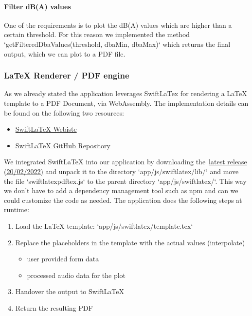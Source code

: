\paragraph{Filter dB(A) values}
One of the requirements is to plot the dB(A) values which are higher than a certain threshold.
For this reason we implemented the method `getFilteredDbaValues(threshold, dbaMin, dbaMax)` which returns the final output,
which we can plot to a PDF file.

\subsubsection{LaTeX Renderer / PDF engine}\label{subsubsec:latex-renderer-pdf-engine}
As we already stated the application leverages SwiftLaTex for rendering a LaTeX template to a PDF Document, via WebAssembly.
The implementation details can be found on the following two resources:

\begin{itemize}
    \item \href{https://www.swiftlatex.com/}{SwiftLaTeX Webiste}
    \item \href{https://github.com/SwiftLaTeX/SwiftLaTeX/}{SwiftLaTeX GitHub Repository}
\end{itemize}

We integrated SwiftLaTeX into our application by downloading the~\href{https://github.com/SwiftLaTeX/SwiftLaTeX/releases/tag/v20022022}{latest release (20/02/2022)}
and unpack it to the directory `app/js/swiftlatex/lib/` and move the file `swiftlatexpdftex.js` to the parent directory `app/js/swiftlatex/`.
This way we don't have to add a dependency management tool such as npm and can we could customize the code as needed.
The application does the following steps at runtime:
\begin{enumerate}
    \item Load the LaTeX template: `app/js/swiftlatex/template.tex`
    \item Replace the placeholders in the template with the actual values (interpolate)
          \begin{itemize}
              \item user provided form data
              \item processed audio data for the plot
          \end{itemize}
    \item Handover the output to SwiftLaTeX
    \item Return the resulting PDF
\end{enumerate}


